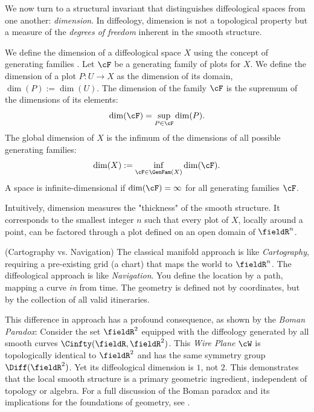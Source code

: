 \begin{article}
  \label{subsec:The Diffeological Dimension}
  
  We now turn to a structural invariant that distinguishes diffeological spaces from one another: \emph{dimension}.
  In diffeology,
  dimension is not a topological property but a measure of the \emph{degrees of freedom} inherent in the smooth structure.
  
  We define the dimension of a diffeological space $X$ using the concept of generating families \cite{PIZ06}.
  Let $\cF$ be a generating family of plots for $X$.
  We define the dimension of a plot $P: U \to X$ as the dimension of its domain,
  $\dim(P) := \dim(U)$.
  The dimension of the family $\cF$ is the supremum of the dimensions of its elements:
  \[
    \dim(\cF) = \sup_{P \in \cF} \dim(P).
    \]
  The global dimension of $X$ is the infimum of the dimensions of all possible generating families:
  \[
    \dim(X) := \inf_{\cF \in \GenFam(X)} \dim(\cF).
    \]
  A space is infinite-dimensional if $\dim(\cF) = \infty$ for all generating families $\cF$.
  
  Intuitively,
  dimension measures the "thickness" of the smooth structure.
  It corresponds to the smallest integer $n$ such that every plot of $X$,
  locally around a point,
  can be factored through a plot defined on an open domain of $\fieldR^n$.
  
  \begin{remark} \textup{(Cartography vs. Navigation)}
    \label{subsec:Cartography vs. Navigation}
    The classical manifold approach is like \emph{Cartography},
    requiring a pre-existing grid (a chart) that maps the world to $\fieldR^n$.
    The diffeological approach is like \emph{Navigation}.
    You define the location by a path,
    mapping a curve \emph{in} from time.
    The geometry is defined not by coordinates,
    but by the collection of all valid itineraries.
    
    This difference in approach has a profound consequence,
    as shown by the \emph{Boman Paradox}:
    Consider the set $\fieldR^2$ equipped with the diffeology generated by all smooth curves $\Cinfty(\fieldR, \fieldR^2)$.
    This \emph{Wire Plane} $\cW$ is topologically identical to $\fieldR^2$ and has the same symmetry group $\Diff(\fieldR^2)$.
    Yet its diffeological dimension is $1$, not $2$.
    This demonstrates that the local smooth structure is a primary geometric ingredient,
    independent of topology or algebra.
    For a full discussion of the Boman paradox and its implications for the foundations of geometry,
    see \cite{PIZ25c}.
  \end{remark}
\end{article}

